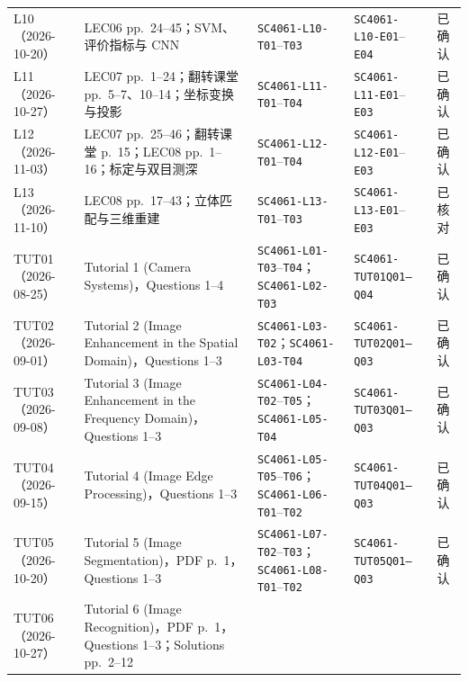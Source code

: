 \begin{tabularx}{\textwidth}{@{}>{\raggedright\arraybackslash}p{2.35cm}>{\raggedright\arraybackslash}X>{\raggedright\arraybackslash}p{3.15cm}>{\raggedright\arraybackslash}p{3.15cm}>{\raggedright\arraybackslash}p{1.25cm}@{}}
  L10（2026-10-20） & LEC06 pp.~24--45；SVM、评价指标与 CNN
  & \texttt{SC4061-L10-T01}--\texttt{T03}
  & \texttt{SC4061-L10-E01}--\texttt{E04}
  & 已确认 \\
  L11（2026-10-27） & LEC07 pp.~1--24；翻转课堂 pp.~5--7、10--14；坐标变换与投影
  & \texttt{SC4061-L11-T01}--\texttt{T04}
  & \texttt{SC4061-L11-E01}--\texttt{E03}
  & 已确认 \\
  L12（2026-11-03） & LEC07 pp.~25--46；翻转课堂 p.~15；LEC08 pp.~1--16；标定与双目测深
  & \texttt{SC4061-L12-T01}--\texttt{T04}
  & \texttt{SC4061-L12-E01}--\texttt{E03}
  & 已确认 \\
  L13（2026-11-10） & LEC08 pp.~17--43；立体匹配与三维重建
  & \texttt{SC4061-L13-T01}--\texttt{T03}
  & \texttt{SC4061-L13-E01}--\texttt{E03}
  & 已核对 \\
  TUT01（2026-08-25） & Tutorial 1 (Camera Systems)，Questions 1--4
  & \texttt{SC4061-L01-T03}--\texttt{T04}；\texttt{SC4061-L02-T03}
  & \texttt{SC4061-TUT01}\newline\texttt{Q01--Q04}
  & 已确认 \\
  TUT02（2026-09-01） & Tutorial 2 (Image Enhancement in the Spatial Domain)，Questions 1--3
  & \texttt{SC4061-L03-T02}；\texttt{SC4061-L03-T04}
  & \texttt{SC4061-TUT02}\newline\texttt{Q01--Q03}
  & 已确认 \\
  TUT03（2026-09-08） & Tutorial 3 (Image Enhancement in the Frequency Domain)，Questions 1--3
  & \texttt{SC4061-L04-T02}\newline--\texttt{T05}；\newline\texttt{SC4061-L05-T04}
  & \texttt{SC4061-TUT03}\newline\texttt{Q01--Q03}
  & 已确认 \\
  TUT04（2026-09-15） & Tutorial 4 (Image Edge Processing)，Questions 1--3
  & \texttt{SC4061-L05-T05}--\texttt{T06}；\newline\texttt{SC4061-L06-T01}--\texttt{T02}
  & \texttt{SC4061-TUT04}\newline\texttt{Q01--Q03}
  & 已确认 \\
  TUT05（2026-10-20） & Tutorial 5 (Image Segmentation)，PDF p.~1，Questions 1--3
  & \texttt{SC4061-L07-T02}--\texttt{T03}；\newline\texttt{SC4061-L08-T01}--\texttt{T02}
  & \texttt{SC4061-TUT05}\newline\texttt{Q01--Q03}
  & 已确认 \\
  TUT06（2026-10-27） & Tutorial 6 (Image Recognition)，PDF p.~1，Questions 1--3；Solutions pp.~2--12

\end{tabularx}
